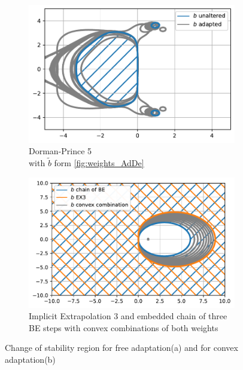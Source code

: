 \documentclass[a4paper]{article}
\numberwithin{equation}{section}
\theoremstyle{plain}
\theoremstyle{definition}
\numberwithin{theorem}{section}
\newcommand{\1}{\mathbbm{1}}
\begin{document}
\begin{figure}
     \centering
     \begin{subfigure}[b]{0.45\textwidth}
         \centering
         \includegraphics[width=\textwidth]{plots/stab_dp5.pdf}
         \caption{Dorman-Prince 5\\
         with $\tilde{b}$ form \ref{fig:weights_AdDe}
         }
         \label{fig:stab_ck5}
     \end{subfigure}
     \hfill
     \begin{subfigure}[b]{0.45\textwidth}
         \centering
         \includegraphics[width=\textwidth]{plots/stab_ex3.pdf}
         \caption{Implicit Extrapolation 3 and embedded chain of three BE steps with convex combinations of both weights}
         \label{fig:stab_ex3}
     \end{subfigure}
        \caption{Change of stability region for free adaptation(a) and for convex adaptation(b)}
        \label{fig:stab}
\end{figure}
\end{document}
